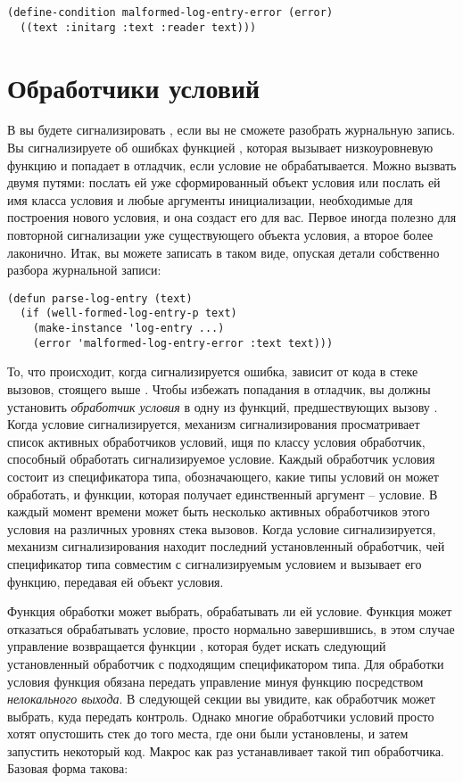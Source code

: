 \begin{lstlisting}
(define-condition malformed-log-entry-error (error)
  ((text :initarg :text :reader text)))
\end{lstlisting}

\section{Обработчики условий}

В  вы будете сигнализировать , если
вы не сможете разобрать журнальную запись. Вы сигнализируете об ошибках функцией
, которая вызывает низкоуровневую функцию  и попадает в отладчик,
если условие не обрабатывается. Можно вызвать  двумя путями: послать ей уже
сформированный объект условия или послать ей имя класса условия и любые аргументы
инициализации, необходимые для построения нового условия, и она создаст его для вас.
Первое иногда полезно для повторной сигнализации уже существующего объекта условия, а
второе более лаконично. Итак, вы можете записать  в таком виде,
опуская детали собственно разбора журнальной записи:

\begin{lstlisting}
(defun parse-log-entry (text)
  (if (well-formed-log-entry-p text)
    (make-instance 'log-entry ...)
    (error 'malformed-log-entry-error :text text)))
\end{lstlisting}

То, что происходит, когда сигнализируется ошибка, зависит от кода в стеке вызовов,
стоящего выше . Чтобы избежать попадания в отладчик, вы должны
установить \textit{обработчик условия} в одну из функций, предшествующих вызову
. Когда условие сигнализируется, механизм сигнализирования
просматривает список активных обработчиков условий, ищя по классу условия обработчик,
способный обработать сигнализируемое условие. Каждый обработчик условия состоит из
спецификатора типа, обозначающего, какие типы условий он может обработать, и функции,
которая получает единственный аргумент -- условие. В каждый момент времени может быть
несколько активных обработчиков этого условия на различных уровнях стека вызовов. Когда
условие сигнализируется, механизм сигнализирования находит последний установленный
обработчик, чей спецификатор типа совместим с сигнализируемым условием и вызывает его
функцию, передавая ей объект условия.

Функция обработки может выбрать, обрабатывать ли ей условие. Функция может отказаться
обрабатывать условие, просто нормально завершившись, в этом случае управление возвращается
функции , которая будет искать следующий установленный обработчик с
подходящим спецификатором типа. Для обработки условия функция обязана передать управление
минуя функцию  посредством \textit{нелокального выхода}. В следующей секции
вы увидите, как обработчик может выбрать, куда передать контроль. Однако многие
обработчики условий просто хотят опустошить стек до того места, где они были установлены,
и затем запустить некоторый код. Макрос  как раз устанавливает такой
тип обработчика. Базовая форма  такова:

